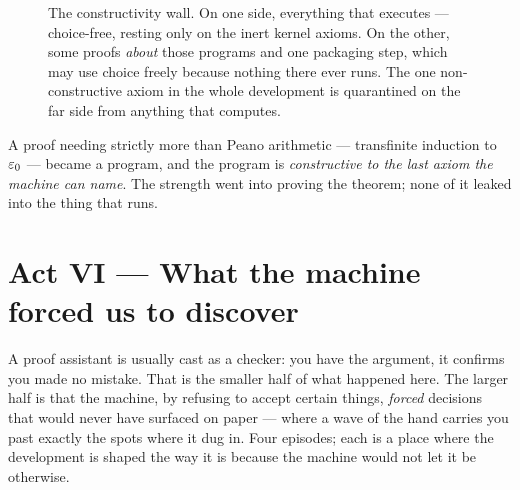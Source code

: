 \documentclass[11pt]{article}
\begin{document}
\begin{figure}[h]
\centering
{}
\caption{The constructivity wall. On one side, everything that executes ---
choice-free, resting only on the inert kernel axioms. On the other, some proofs
\emph{about} those programs and one packaging step, which may use choice freely
because nothing there ever runs. The one non-constructive axiom in the whole
development is quarantined on the far side from anything that computes.}
\label{fig:wall}
\end{figure}

A proof needing strictly more than Peano arithmetic --- transfinite induction to
$\varepsilon_0$ --- became a program, and the program is \emph{constructive to the last
axiom the machine can name}. The strength went into proving the theorem; none of
it leaked into the thing that runs.

\section{Act VI --- What the machine forced us to discover}

A proof assistant is usually cast as a checker: you have the argument, it
confirms you made no mistake. That is the smaller half of what happened here.
The larger half is that the machine, by refusing to accept certain things,
\emph{forced} decisions that would never have surfaced on paper --- where a
wave of the hand carries you past exactly the spots where it dug in. Four
episodes; each is a place where the development is shaped the way it is because
the machine would not let it be otherwise.
\end{document}
